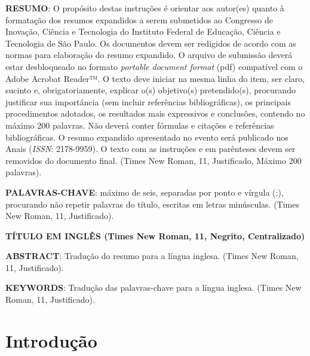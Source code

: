 \documentclass[a4paper,11pt]{article} %
\begin{document}






\vspace{0.5cm}
\noindent\textbf{RESUMO}: O propósito destas instruções é orientar aos autor(es) quanto à formatação dos resumos expandidos a serem submetidos ao Congresso de Inovação, Ciência e Tecnologia do Instituto Federal de Educação, Ciência e Tecnologia de São Paulo. Os documentos devem ser redigidos de acordo com as normas para elaboração do resumo expandido. O arquivo de submissão deverá estar desbloqueado no formato \textit{portable document format} (pdf) compatível com o Adobe Acrobat Reader™. O texto deve iniciar na mesma linha do item, ser claro, sucinto e, obrigatoriamente, explicar o(s) objetivo(s) pretendido(s), procurando justificar sua importância (sem incluir referências bibliográficas), os principais procedimentos adotados, os resultados mais expressivos e conclusões, contendo no máximo 200 palavras. Não deverá conter fórmulas e citações e referências bibliográficas. O resumo expandido apresentado no evento será publicado nos Anais (\textit{ISSN}: 2178-9959). O texto com as instruções e em parênteses devem ser removidos do documento final. (Times New Roman, 11, Justificado, Máximo 200 palavras).

\vspace{0.5cm}
\noindent\textbf{PALAVRAS-CHAVE}: máximo de seis, separadas por ponto e vírgula (;), procurando não repetir palavras do título, escritas em letras minúsculas. (Times New Roman, 11, Justificado).

 \begin{center}
 \textbf{TÍTULO EM INGLÊS (Times New Roman, 11, Negrito, Centralizado)}
 \end{center}

\noindent\textbf{ABSTRACT}: Tradução do resumo para a língua inglesa. (Times New Roman, 11, Justificado).

\noindent\textbf{KEYWORDS}: Tradução das palavras-chave para a língua inglesa. (Times New Roman, 11, Justificado).

\section*{Introdução}
\end{document}
